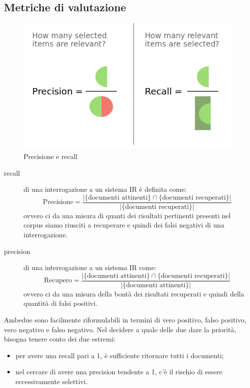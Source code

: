 \FloatBarrier

\subsection{Metriche di valutazione}
\label{sub:metriche-valutazione}
\begin{center}
\begin{figure}
    \includegraphics[scale=0.2]{immagini/precisionrecall.png}
    \caption{Precisione e recall}
\end{figure}
\end{center}
\begin{description}
    \item[recall] di una interrogazione a un sistema IR è definita come:
    \begin{equation}
        \mbox{Precisione}=\frac{|\{\mbox{documenti attinenti}\}\cap\{\mbox{documenti recuperati}\}|}{|\{\mbox{documenti recuperati}\}|}
    \end{equation}
    ovvero ci da una misura di quanti dei risultati pertinenti presenti nel corpus siamo riusciti a recuperare e quindi dei falsi negativi di una interrogazione. 
    \item[precision] di una interrogazione a un sistema IR come: 
    \begin{equation}
        \mbox{Recupero}=\frac{|\{\mbox{documenti attinenti}\}\cap\{\mbox{documenti recuperati}\}|}{|\{\mbox{documenti attinenti}\}|} 
    \end{equation}
    ovvero ci da una misura della bontà dei risultati recuperati e quindi della quantità di falsi positivi.
\end{description}
Ambedue sono facilmente riformulabili in termini di vero positivo, falso positivo, vero negativo e falso negativo. Nel decidere a quale delle due dare la priorità, bisogna tenere conto dei due estremi:
\begin{itemize}
    \item per avere una recall pari a 1, è sufficiente ritornare tutti i documenti;
    \item nel cercare di avere una precision tendente a 1, c'è il rischio di essere eccessivamente selettivi. 
\end{itemize}


